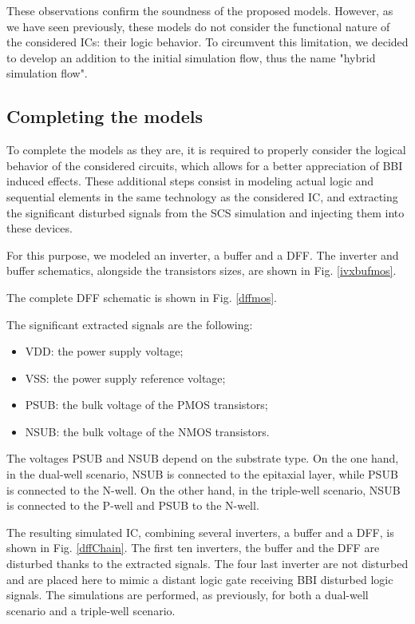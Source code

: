 	These observations confirm the soundness of the proposed models.
	However, as we have seen previously, these models do not consider the functional nature of the considered ICs: their logic behavior.
	To circumvent this limitation, we decided to develop an addition to the initial simulation flow, thus the name "hybrid simulation flow".

\subsection{Completing the models}
	To complete the models as they are, it is required to properly consider the logical behavior of the considered circuits, which allows for a better appreciation of BBI induced effects.
	These additional steps consist in modeling actual logic and sequential elements  in the same technology as the considered IC, and extracting the significant disturbed signals from the SCS simulation and injecting them into these devices.
	
	For this purpose, we modeled an inverter, a buffer and a DFF.
	The inverter and buffer schematics, alongside the transistors sizes, are shown in Fig. \ref{ivxbufmos}.
	
	The complete DFF schematic is shown in Fig. \ref{dffmos}.
	
	The significant extracted signals are the following:
	\begin{itemize}
		\item VDD: the power supply voltage;
		\item VSS: the power supply reference voltage;
		\item PSUB: the bulk voltage of the PMOS transistors;
		\item NSUB: the bulk voltage of the NMOS transistors.
	\end{itemize}
	The voltages PSUB and NSUB depend on the substrate type.
	On the one hand, in the dual-well scenario, NSUB is connected to the epitaxial layer, while PSUB is connected to the N-well.
	On the other hand, in the triple-well scenario, NSUB is connected to the P-well and PSUB to the N-well.
	
	The resulting simulated IC, combining several inverters, a buffer and a DFF, is shown in Fig. \ref{dffChain}.
	The first ten inverters, the buffer and the DFF are disturbed thanks to the extracted signals.
	The four last inverter are not disturbed and are placed here to mimic a distant logic gate receiving BBI disturbed logic signals.
	The simulations are performed, as previously, for both a dual-well scenario and a triple-well scenario.
